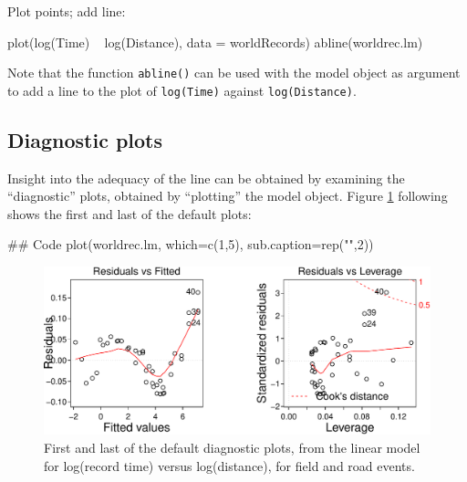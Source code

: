\documentclass{tufte-book}\usepackage[]{graphicx}\usepackage[]{color}
\newcommand{\txtt}[1]{\texttt{#1}}
\begin{document}
\begin{marginfigure}
Plot points; add line:
\begin{Schunk}
\begin{Sinput}
plot(log(Time) ~ log(Distance),
     data = worldRecords)
abline(worldrec.lm)
\end{Sinput}
\end{Schunk}
\end{marginfigure}
Note that the function \txtt{abline()} can be used
  with the model object as argument to add a line to the plot of
  \txtt{log(Time)} against \txtt{log(Distance)}.

\subsection*{Diagnostic plots}

Insight into the adequacy of the line 
can be obtained by examining the
``diagnostic'' plots, obtained by ``plotting'' the model object.
Figure \ref{fig:wr-diag} following shows the first and last of the default
plots:
\begin{Schunk}
\begin{Sinput}
## Code
plot(worldrec.lm, which=c(1,5),
     sub.caption=rep("",2))
\end{Sinput}
\end{Schunk}

\begin{figure}
\begin{Schunk}


\centerline{\includegraphics[width=\textwidth]{figs/03-diag12-1} }

\end{Schunk}
      \caption{First and last of the default diagnostic plots, from the
        linear model for log(record time) versus log(distance), for
        field and road events.}
\label{fig:wr-diag}
\end{figure}
\end{document}
